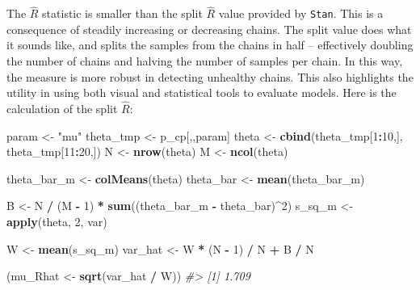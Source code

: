 \documentclass[11pt, oneside, openany]{scrbook}
\newenvironment{Shaded}{\begin{snugshade}}{\end{snugshade}}
\newcommand{\CommentTok}[1]{\textcolor[rgb]{0.56,0.35,0.01}{\textit{#1}}}
\newcommand{\DecValTok}[1]{\textcolor[rgb]{0.00,0.00,0.81}{#1}}
\newcommand{\KeywordTok}[1]{\textcolor[rgb]{0.13,0.29,0.53}{\textbf{#1}}}
\newcommand{\NormalTok}[1]{#1}
\newcommand{\OperatorTok}[1]{\textcolor[rgb]{0.81,0.36,0.00}{\textbf{#1}}}
\newcommand{\StringTok}[1]{\textcolor[rgb]{0.31,0.60,0.02}{#1}}
\begin{document}

The \(\hat{R}\) statistic is smaller than the split \(\hat{R}\) value provided by \texttt{Stan}. This is a consequence of steadily increasing or decreasing chains. The split value does what it sounds like, and splits the samples from the chains in half -- effectively doubling the number of chains and halving the number of samples per chain. In this way, the measure is more robust in detecting unhealthy chains. This also highlights the utility in using both visual and statistical tools to evaluate models. Here is the calculation of the split \(\hat{R}\):


\begin{Shaded}
\begin{Highlighting}[]
\NormalTok{param <-}\StringTok{ "mu"}
\NormalTok{theta_tmp <-}\StringTok{ }\NormalTok{p_cp[,,param]}
\NormalTok{theta <-}\StringTok{ }\KeywordTok{cbind}\NormalTok{(theta_tmp[}\DecValTok{1}\OperatorTok{:}\DecValTok{10}\NormalTok{,], theta_tmp[}\DecValTok{11}\OperatorTok{:}\DecValTok{20}\NormalTok{,])}
\NormalTok{N     <-}\StringTok{ }\KeywordTok{nrow}\NormalTok{(theta)}
\NormalTok{M     <-}\StringTok{ }\KeywordTok{ncol}\NormalTok{(theta)}

\NormalTok{theta_bar_m <-}\StringTok{ }\KeywordTok{colMeans}\NormalTok{(theta)}
\NormalTok{theta_bar   <-}\StringTok{ }\KeywordTok{mean}\NormalTok{(theta_bar_m)}

\NormalTok{B <-}\StringTok{ }\NormalTok{N }\OperatorTok{/}\StringTok{ }\NormalTok{(M }\OperatorTok{-}\StringTok{ }\DecValTok{1}\NormalTok{) }\OperatorTok{*}\StringTok{ }\KeywordTok{sum}\NormalTok{((theta_bar_m }\OperatorTok{-}\StringTok{ }\NormalTok{theta_bar)}\OperatorTok{^}\DecValTok{2}\NormalTok{)}
\NormalTok{s_sq_m <-}\StringTok{ }\KeywordTok{apply}\NormalTok{(theta, }\DecValTok{2}\NormalTok{, var)}

\NormalTok{W <-}\StringTok{ }\KeywordTok{mean}\NormalTok{(s_sq_m)}
\NormalTok{var_hat <-}\StringTok{ }\NormalTok{W }\OperatorTok{*}\StringTok{ }\NormalTok{(N }\OperatorTok{-}\StringTok{ }\DecValTok{1}\NormalTok{) }\OperatorTok{/}\StringTok{ }\NormalTok{N }\OperatorTok{+}\StringTok{ }\NormalTok{B }\OperatorTok{/}\StringTok{ }\NormalTok{N}

\NormalTok{(mu_Rhat <-}\StringTok{ }\KeywordTok{sqrt}\NormalTok{(var_hat }\OperatorTok{/}\StringTok{ }\NormalTok{W))}
\CommentTok{#> [1] 1.709}
\end{Highlighting}
\end{Shaded}
\end{document}
